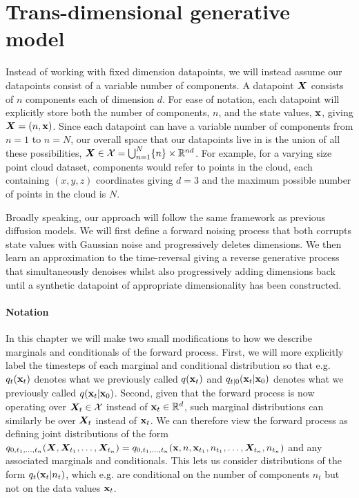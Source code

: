 \section{Trans-dimensional generative model}
Instead of working with fixed dimension datapoints, we will instead assume our datapoints consist of a variable number of components. A datapoint ${\bm{X}}$ consists of $n$ components each of dimension $d$. For ease of notation, each datapoint will explicitly store both the number of components, $n$, and the state values, ${\mathbf{x}}$, giving ${\bm{X}} = (n, {\mathbf{x}})$. Since each datapoint can have a variable number of components from $n=1$ to $n=N$, our overall space that our datapoints live in is the union of all these possibilities, ${\bm{X}} \in {\mathcal{X}} = \bigcup_{n=1}^N \{n \} \times \mathbb{R}^{nd}$. For example, for a varying size point cloud dataset, components would refer to points in the cloud, each containing $(x,y,z)$ coordinates giving $d=3$ and the maximum possible number of points in the cloud is $N$.

Broadly speaking, our approach will follow the same framework as previous diffusion models. We will first define a forward noising process that both corrupts state values with Gaussian noise and progressively deletes dimensions.
We then learn an approximation to the time-reversal giving a reverse generative process that simultaneously denoises whilst also progressively adding dimensions back until a synthetic datapoint of appropriate dimensionality has been constructed.

\paragraph{Notation}
In this chapter we will make two small modifications to how we describe marginals and conditionals of the forward process. First, we will more explicitly label the timesteps of each marginal and conditional distribution so that e.g. $q_t({\mathbf{x}}_t)$ denotes what we previously called $q({\mathbf{x}}_t)$ and $q_{t|0}({\mathbf{x}}_t|{\mathbf{x}}_0)$ denotes what we previously called $q({\mathbf{x}}_t|{\mathbf{x}}_0)$. Second, given that the forward process is now operating over ${\bm{X}}_t \in {\mathcal{X}}$ instead of ${\mathbf{x}}_t \in \mathbb{R}^{d}$, such marginal distributions can similarly be over ${\bm{X}}_t$ instead of ${\mathbf{x}}_t$. We can therefore view the forward process as defining joint distributions of the form $q_{0,t_1,\ldots,t_n}({\bm{X}},{\bm{X}}_{t_1},\ldots,{\bm{X}}_{t_n}) = q_{0,t_1,\ldots,t_n}({\mathbf{x}},n,{\mathbf{x}}_{t_1},n_{t_1},\ldots,{\bm{X}}_{t_n},n_{t_n})$ and any associated marginals and conditionals. This lets us consider distributions of the form $q_t({\mathbf{x}}_t|n_t)$, which e.g. are conditional on the number of components $n_t$ but not on the data values ${\mathbf{x}}_t$.

